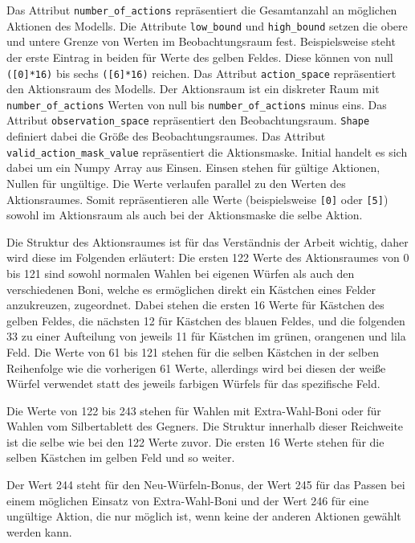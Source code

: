Das Attribut \texttt{number\_of\_actions} repräsentiert die Gesamtanzahl an möglichen Aktionen des Modells. Die Attribute \texttt{low\_bound} und \texttt{high\_bound} setzen die obere und untere Grenze von Werten im Beobachtungsraum fest. Beispielsweise steht der erste Eintrag in beiden für Werte des gelben Feldes. Diese können von null \texttt{([0]*16)} bis sechs \texttt{([6]*16)} reichen. Das Attribut \texttt{action\_space} repräsentiert den Aktionsraum des Modells. Der Aktionsraum ist ein diskreter Raum mit \texttt{number\_of\_actions} Werten von null bis \texttt{number\_of\_actions} minus eins. Das Attribut \texttt{observation\_space} repräsentiert den Beobachtungsraum. \texttt{Shape} definiert dabei die Größe des Beobachtungsraumes. Das Attribut \texttt{valid\_action\_mask\_value} repräsentiert die Aktionsmaske. Initial handelt es sich dabei um ein Numpy Array aus Einsen. Einsen stehen für gültige Aktionen, Nullen für ungültige. Die Werte verlaufen parallel zu den Werten des Aktionsraumes. Somit repräsentieren alle Werte (beispielsweise \texttt{[0]} oder \texttt{[5]}) sowohl im Aktionsraum als auch bei der Aktionsmaske die selbe Aktion.

Die Struktur des Aktionsraumes ist für das Verständnis der Arbeit wichtig, daher wird diese im Folgenden erläutert: Die ersten 122 Werte des Aktionsraumes von 0 bis 121 sind sowohl normalen Wahlen bei eigenen Würfen als auch den verschiedenen Boni, welche es ermöglichen direkt ein Kästchen eines Felder anzukreuzen, zugeordnet. Dabei stehen die ersten 16 Werte für Kästchen des gelben Feldes, die nächsten 12 für Kästchen des blauen Feldes, und die folgenden 33 zu einer Aufteilung von jeweils 11 für Kästchen im grünen, orangenen und lila Feld. Die Werte von 61 bis 121 stehen für die selben Kästchen in der selben Reihenfolge wie die vorherigen 61 Werte, allerdings wird bei diesen der weiße Würfel verwendet statt des jeweils farbigen Würfels für das spezifische Feld.

Die Werte von 122 bis 243 stehen für Wahlen mit Extra-Wahl-Boni oder für Wahlen vom Silbertablett des Gegners. Die Struktur innerhalb dieser Reichweite ist die selbe wie bei den 122 Werte zuvor. Die ersten 16 Werte stehen für die selben Kästchen im gelben Feld und so weiter.

Der Wert 244 steht für den Neu-Würfeln-Bonus, der Wert 245 für das Passen bei einem möglichen Einsatz von Extra-Wahl-Boni und der Wert 246 für eine ungültige Aktion, die nur möglich ist, wenn keine der anderen Aktionen gewählt werden kann.
